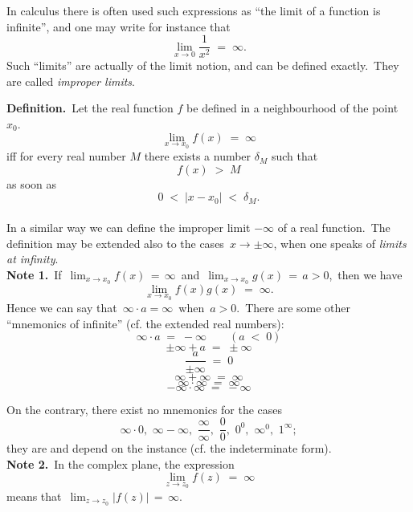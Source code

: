 \documentclass[12pt]{article}
\begin{document}
In calculus there is often used such expressions as ``the limit of a function is infinite'', and one may write for instance that 
$$\lim_{x \to 0}\frac{1}{x^2} \;=\; \infty.$$
Such ``limits'' are actually  of the limit notion, and can be defined exactly.\, They are called {\em improper limits}.


\textbf{Definition.}\, Let the real function $f$ be defined in a neighbourhood of the point $x_0$. 
            $$\lim_{x \to x_0}f(x) \;=\; \infty$$
iff for every real number $M$ there exists a number $\delta_M$ such that
                     $$f(x) \;>\; M$$
as soon as
              $$0 \;<\; |x\!-\!x_0| \;<\; \delta_M.$$\\
In a similar way we can define the improper limit $-\infty$ of a real function.\, The definition may be extended also to the cases\, $x \to \pm\infty$, when one speaks of \emph{limits at infinity}.\\


\textbf{Note 1.}\, If\, $\lim_{x \to x_0}f(x) \,=\, \infty$\, and\, 
$\lim_{x \to x_0}g(x) \,=\, a > 0$,\, then we have 
          $$\lim_{x \to x_0}f(x)g(x) \;=\; \infty.$$
Hence we can say that\, $\infty\cdot a = \infty$\, when\, $a > 0$.\, There are some other  ``mnemonics of infinite'' (cf. the extended real numbers):
$$\infty\cdot a \;=\; -\infty \qquad(a \;<\; 0)$$
$$\pm\infty+a \;=\; \pm\infty$$
$$\frac{a}{\pm\infty} \;=\; 0$$
$$\infty+\infty \;=\; \infty$$
$$\infty\cdot\infty \;=\; \infty$$
$$-\infty\cdot\infty \;=\; -\infty$$


On the contrary, there exist no mnemonics for the cases
   $$\infty\cdot0,\,\, \infty-\infty,\,\, \frac{\infty}{\infty},\,\, 
     \frac{0}{0},\,\, 0^0,\,\, \infty^0,\,\, 1^\infty;$$
they are  and depend on the instance (cf. the indeterminate form).\\


\textbf{Note 2.}\, In the complex plane, the expression
          $$\lim_{z \to z_0}f(z) \;=\; \infty$$
means that\, $\displaystyle \lim_{z \to z_0}|f(z)| \,=\, \infty$.
\end{document}
